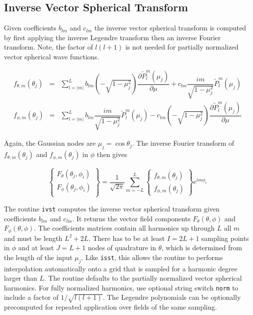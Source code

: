 {\footnotesize
{}
}



\subsection{Inverse Vector Spherical Transform}

Given coefficients $b_{lm}$ and $c_{lm}$ the inverse vector spherical transform is computed by first applying the inverse Legendre transform then an inverse Fourier transform.  Note, the factor of $l(l+1)$ is not needed for partially normalized vector spherical wave functions.

\begin{eqnarray}
f_{\theta,m}(\theta_j) &=& \sum_{l=\vert m \vert }^L b_{lm} \left(-\sqrt{1-\mu_j^2}\right)\dfrac{\partial \widetilde{P}_l^m(\mu_j)}{\partial\mu} + c_{lm}  \dfrac{im}{\sqrt{1-\mu_j^2}} \widetilde{P}_l^m(\mu_j) \label{eqfthj}\\
f_{\phi,m}(\theta_j) &=& \sum_{l=\vert m \vert }^L b_{lm}  \dfrac{im}{\sqrt{1-\mu_j^2}} \widetilde{P}_l^m(\mu_j) - c_{lm} \left(-\sqrt{1-\mu_j^2}\right)\dfrac{\partial \widetilde{P}_l^m(\mu_j)}{\partial\mu} 
\label{eqphij}
\end{eqnarray}

Again, the Gaussian nodes are $\mu_j = \cos\theta_j$.  The inverse Fourier transform of $f_{\theta,m}(\theta_j)$ and $f_{\phi,m}(\theta_j)$ in $\phi$ then gives

\begin{equation}
\left\{
\begin{array}{c}
F_{\theta}(\theta_j,\phi_i)\\
F_{\phi}(\theta_j,\phi_i) \\
\end{array}
\right\}
=
\dfrac{1}{\sqrt{2\pi}}
\sum_{m=-L}^L
\left\{\begin{array}{c}
f_{\theta,m}(\theta_j) \\
f_{\phi,m}(\theta_j) 
\end{array}\right\}
e^{im\phi_i}
\end{equation}

The routine \texttt{ivst} computes the inverse vector spherical transform given coefficients $b_{lm}$ and $c_{lm}$.  It returns the vector field components $F_{\theta}(\theta,\phi)$ and $F_{\phi}(\theta,\phi)$. The coefficients matrices contain all harmonics up through $L$ all $m$ and must be length $L^2 + 2L$. There has to be at least $I = 2L+1$ sampling points in $\phi$ and at least $J = L+1$ nodes of quadrature in $\theta$, which is determined from the length of the input $\mu_j$. Like \texttt{isst}, this allows the routine to performs interpolation automatically onto a grid that is sampled for a harmonic degree larger than $L$. The routine defaults to the partially normalized vector spherical harmonics. For fully normalized harmonics, use optional string switch \texttt{norm} to include a factor of $1/\sqrt{l (l+1)}$. The Legendre polynomials can be optionally precomputed for repeated application over fields of the same sampling.


